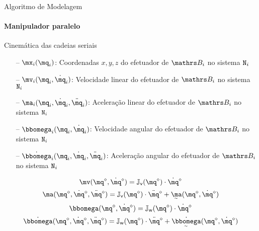 \documentclass[25pt,landscape]{beamer}
\begin{document}
\begin{frame}{Algoritmo de Modelagem}
    \framesubtitle{Manipulador paralelo}
    \begin{block}{Cinemática das cadeias seriais}
		\begin{itemize}
			\item[--] $\mx_i(\mq_i)$: Coordenadas $x,y,z$ do efetuador de $\ssB_i$ no sistema $\mathtt{N}_i$
			\item[--] $\mv_i(\mq_i, \dot{\mq}_i)$: Velocidade linear do efetuador de $\ssB_i$ no sistema $\mathtt{N}_i$
			\item[--] $\ma_i(\mq_i, \dot{\mq}_i, \ddot{\mq}_i)$: Aceleração linear do efetuador de $\ssB_i$ no sistema $\mathtt{N}_i$
			\item[--] $\momega_i(\mq_i, \dot{\mq}_i)$: Velocidade angular do efetuador de $\ssB_i$ no sistema $\mathtt{N}_i$
			\item[--] $\dot{\momega}_i(\mq_i, \dot{\mq}_i, \ddot{\mq}_i)$: Aceleração angular do efetuador de $\ssB_i$ no sistema $\mathtt{N}_i$
			\\[12pt]
		\end{itemize}
		\pause
		$$ \mv(\mq^\diamond, \dot{\mq}^\diamond) = \mJ_{\mathsf{v}}(\mq^\diamond) \cdot \dot{\mq}^\diamond $$
    	$$ \ma(\mq^\diamond, \dot{\mq}^\diamond, \ddot{\mq}^\diamond) = \mJ_{\mathsf{v}}(\mq^\diamond) \cdot \ddot{\mq}^\diamond + \underaccent{\sim}{\ma}(\mq^\diamond, \dot{\mq}^\diamond) $$
    	$$ \momega(\mq^\diamond, \dot{\mq}^\diamond) = \mJ_{\mathsf{w}}(\mq^\diamond) \cdot \dot{\mq}^\diamond $$
    	$$ \dot{\momega}(\mq^\diamond, \dot{\mq}^\diamond, \ddot{\mq}^\diamond) = \mJ_{\mathsf{w}}(\mq^\diamond) \cdot \ddot{\mq}^\diamond + \underaccent{\sim}{\dot{\momega}}(\mq^\diamond, \dot{\mq}^\diamond) $$
    \end{block}
\end{frame}
\end{document}

